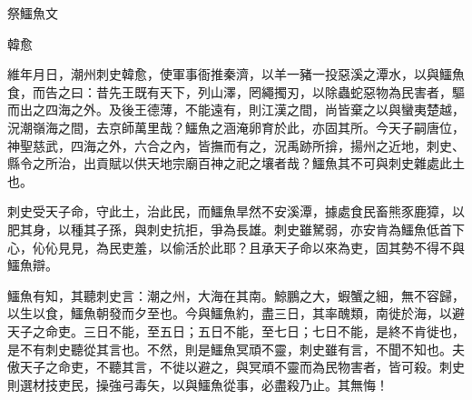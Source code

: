 祭鱷魚文

韓愈

維年月日，潮州刺史韓愈，使軍事衙推秦濟，以羊一豬一投惡溪之潭水，以與鱷魚食，而告之曰：昔先王既有天下，列山澤，罔繩擉刃，以除蟲蛇惡物為民害者，驅而出之四海之外。及後王德薄，不能遠有，則江漢之間，尚皆棄之以與蠻夷楚越，況潮嶺海之間，去京師萬里哉？鱷魚之涵淹卵育於此，亦固其所。今天子嗣唐位，神聖慈武，四海之外，六合之內，皆撫而有之，況禹跡所揜，揚州之近地，刺史、縣令之所治，出貢賦以供天地宗廟百神之祀之壤者哉？鱷魚其不可與刺史雜處此土也。

刺史受天子命，守此土，治此民，而鱷魚旱然不安溪潭，據處食民畜熊豕鹿獐，以肥其身，以種其子孫，與刺史抗拒，爭為長雄。刺史雖駑弱，亦安肯為鱷魚低首下心，伈伈見見，為民吏羞，以偷活於此耶？且承天子命以來為吏，固其勢不得不與鱷魚辯。

鱷魚有知，其聽刺史言：潮之州，大海在其南。鯨鵬之大，蝦蟹之細，無不容歸，以生以食，鱷魚朝發而夕至也。今與鱷魚約，盡三日，其率醜類，南徙於海，以避天子之命吏。三日不能，至五日；五日不能，至七日；七日不能，是終不肯徙也，是不有刺史聽從其言也。不然，則是鱷魚冥頑不靈，刺史雖有言，不聞不知也。夫傲天子之命吏，不聽其言，不徙以避之，與冥頑不靈而為民物害者，皆可殺。刺史則選材技吏民，操強弓毒矢，以與鱷魚從事，必盡殺乃止。其無悔！